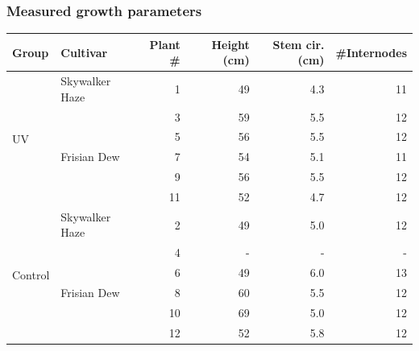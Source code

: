 \documentclass[
    12pt,
    aspectratio=1610,
    b,
    bibliography=../bibliography.bib,
    link-citations]{beamer}
\begin{document}
    \begin{frame}
        \frametitle{Measured growth parameters}
        \footnotesize
        \begin{tabular}{llrrrr}
            Group & Cultivar & Plant \# & Height (\unit[mode=text]{\cm}) & Stem cir. (\unit[mode=text]{\cm}) & \#{}Internodes \\
            \midrule
            \multirow{6}{*}{UV} & Skywalker Haze & 1 & 49 & 4.3 & 11 \\
            & \multirow[t]{5}{*}{Frisian Dew} & 3 & 59 & 5.5 & 12 \\
            & & 5 & 56 & 5.5 & 12 \\
            & & 7 & 54 & 5.1 & 11 \\
            & & 9 & 56 & 5.5 & 12 \\
            & & 11 & 52 & 4.7 & 12 \\
            \midrule
            \multirow{6}{*}{Control} & Skywalker Haze & 2 & 49 & 5.0 & 12 \\
            & \multirow[t]{5}{*}{Frisian Dew} & 4 & - & - & - \\
            & & 6 & 49 & 6.0 & 13 \\
            & & 8 & 60 & 5.5 & 12 \\
            & & 10 & 69 & 5.0 & 12 \\
            & & 12 & 52 & 5.8 & 12 \\
        \end{tabular}
    \end{frame}
\end{document}
